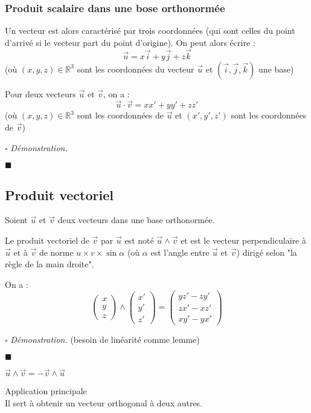 \documentclass[a4paper, titlepage]{article}
\newenvironment{lititle}%
{\vspace{7mm}\LobsterTwo \large}%
{\\}
\renewenvironment{proof}{$\square$ \footnotesize\textit{Démonstration.}}{\begin{flushright}$\blacksquare$\end{flushright}}
\begin{document}
	\subsubsection{Produit scalaire dans une bose orthonormée}
	\begin{defn}
		Un vecteur est alors caractérisé par trois coordonnées (qui sont celles du point d'arrivé si le vecteur part du point d'origine). On peut alors écrire :
		$$ \vec u = x\vec i+y\vec j+z\vec k $$
		(où $(x,y,z)\in\mathbb{R}^3$ sont les coordonnées du vecteur $\vec u$ et $(\vec i,\vec j, \vec k)$ une base)
	\end{defn}
	\begin{props}
		Pour deux vecteurs $\vec u$ et $\vec v$, on a :
		$$ \vec u\cdot\vec v = xx'+yy'+zz' $$
		(où $(x,y,z)\in\mathbb{R}^3$ sont les coordonnées de $\vec u$ et $(x',y',z')$ sont les coordonnées de $\vec v$)
	\end{props}
	\begin{proof}
		\AQT
	\end{proof}
	\subsection{Produit vectoriel}
	\begin{defn}
		Soient $\vec u$ et $\vec v$ deux vecteurs dans une base orthonormée.

		Le produit vectoriel de $\vec v$ par $\vec u$ est noté $ \vec u\land \vec v$ et est le vecteur perpendiculaire à $\vec u$ et à $\vec v$ de norme $u\times v\times\sin\alpha$ (où $\alpha$ est l'angle entre $\vec u$ et $\vec v$) dirigé selon "la règle de la main droite".
	\end{defn}
	\begin{props}
		On a :
		$$ 
		\begin{pmatrix} x\\y\\z \end{pmatrix} \land \begin{pmatrix} x'\\y'\\z' \end{pmatrix} =
		\begin{pmatrix} yz'-zy'\\zx'-xz'\\xy'-yx' \end{pmatrix} 
		$$
	\end{props}
	\begin{proof}
		\AQT (besoin de linéarité comme lemme)
	\end{proof}
	\begin{warn}
		$\vec u\land\vec v = -\vec v\land\vec u$
	\end{warn}
	\begin{lititle}
		Application principale
	\end{lititle}
	Il sert à obtenir un vecteur orthogonal à deux autres.
\end{document}
